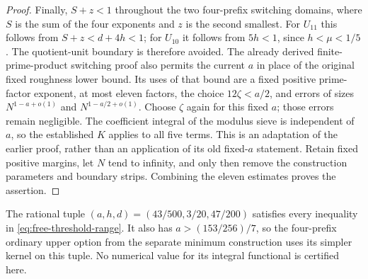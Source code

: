 \begin{proof}
Finally, $S+z<1$ throughout the two four-prefix switching domains,
where $S$ is the sum of the four exponents and $z$ is the second
smallest. For $U_{11}$ this follows from $S+z<d+4h<1$;
for $U_{10}$ it follows from $5h<1$, since $h<\mu<1/5$.
The quotient-unit boundary is therefore avoided. The already derived
finite-prime-product switching proof also permits the current $a$ in
place of the original fixed roughness lower bound. Its uses of that
bound are a fixed positive prime-factor exponent, at most eleven
factors, the choice $12\zeta<a/2$, and errors of sizes
$N^{1-a+o(1)}$ and $N^{1-a/2+o(1)}$. Choose $\zeta$ again for this
fixed $a$; those errors remain negligible. The coefficient integral
of the modulus sieve is independent of $a$, so the established
$K$ applies to all five terms. This is an adaptation of the earlier
proof, rather than an application of its old fixed-$a$ statement.
Retain fixed positive margins, let $N$ tend to
infinity, and only then remove the construction parameters and
boundary strips. Combining the eleven estimates proves the assertion.
\end{proof}

The rational tuple $(a,h,d)=(43/500,3/20,47/200)$ satisfies every
inequality in \eqref{eq:free-threshold-range}. It also has
$a>(153/256)/7$, so the four-prefix ordinary upper option from the
separate minimum construction uses its simpler kernel on this tuple.
No numerical value for its integral functional is certified here.
